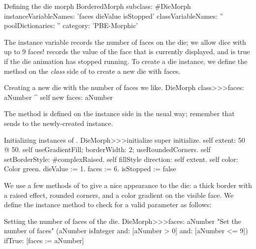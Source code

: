 \documentclass[a4paper,10pt,twoside]{book}
\begin{document}

\begin{classdef}{Defining the die morph}
BorderedMorph subclass: #DieMorph
	instanceVariableNames: 'faces dieValue isStopped'
	classVariableNames: ''
	poolDictionaries: ''
	category: 'PBE-Morphic'
\end{classdef}

The instance variable  records the number of faces on the die; we allow dice with up to 9 faces!  records the value of the face that is currently displayed, and  is true if the die animation has stopped running.
To create a die instance, we define the  method on the \emph{class} side of  to create a new die with  faces.
\begin{method}{Creating a new die with the number of faces we like.}
DieMorph class>>>faces: aNumber
	^ self new faces: aNumber
\end{method}

The  method is defined on the instance side in the usual way; remember that  sends  to the newly-created instance.
\begin{method}{Initializing instances of .}
DieMorph>>>initialize
	super initialize.
	self extent: 50 @ 50.
	self useGradientFill; borderWidth: 2; useRoundedCorners.
	self setBorderStyle: #complexRaised.
	self fillStyle direction: self extent.
	self color: Color green.
	dieValue := 1.
	faces := 6.
	isStopped := false
\end{method}

We use a few methods of  to give a nice appearance to the die: a thick border with a raised effect, rounded corners, and a color gradient on the visible face.
We define the instance method  to check for a valid parameter as follows:
\begin{method}{Setting the number of faces of the die.}
DieMorph>>>faces: aNumber
	"Set the number of faces"
	(aNumber isInteger
			and: [aNumber > 0]
			and: [aNumber <= 9])
		ifTrue: [faces := aNumber]
\end{method}
\end{document}
